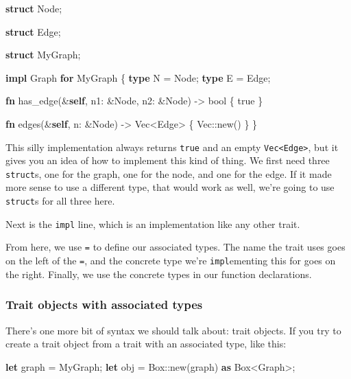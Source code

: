 \documentclass[a4paper,]{book}
\newenvironment{Shaded}{\begin{snugshade}}{\end{snugshade}}
\newcommand{\KeywordTok}[1]{\textcolor[rgb]{0.13,0.29,0.53}{\textbf{{#1}}}}
\newcommand{\DataTypeTok}[1]{\textcolor[rgb]{0.13,0.29,0.53}{{#1}}}
\newcommand{\ConstantTok}[1]{\textcolor[rgb]{0.00,0.00,0.00}{{#1}}}
\newcommand{\NormalTok}[1]{{#1}}
\begin{document}
\begin{Shaded}
\begin{Highlighting}[]
\KeywordTok{struct} \NormalTok{Node;}

\KeywordTok{struct} \NormalTok{Edge;}

\KeywordTok{struct} \NormalTok{MyGraph;}

\KeywordTok{impl} \NormalTok{Graph }\KeywordTok{for} \NormalTok{MyGraph \{}
    \KeywordTok{type} \NormalTok{N = Node;}
    \KeywordTok{type} \NormalTok{E = Edge;}

    \KeywordTok{fn} \NormalTok{has_edge(&}\KeywordTok{self}\NormalTok{, n1: &Node, n2: &Node) -> }\DataTypeTok{bool} \NormalTok{\{}
        \ConstantTok{true}
    \NormalTok{\}}

    \KeywordTok{fn} \NormalTok{edges(&}\KeywordTok{self}\NormalTok{, n: &Node) -> }\DataTypeTok{Vec}\NormalTok{<Edge> \{}
        \DataTypeTok{Vec}\NormalTok{::new()}
    \NormalTok{\}}
\NormalTok{\}}
\end{Highlighting}
\end{Shaded}

This silly implementation always returns \texttt{true} and an empty
\texttt{Vec\textless{}Edge\textgreater{}}, but it gives you an idea of
how to implement this kind of thing. We first need three
\texttt{struct}s, one for the graph, one for the node, and one for the
edge. If it made more sense to use a different type, that would work as
well, we're going to use \texttt{struct}s for all three here.

Next is the \texttt{impl} line, which is an implementation like any
other trait.

From here, we use \texttt{=} to define our associated types. The name
the trait uses goes on the left of the \texttt{=}, and the concrete type
we're \texttt{impl}ementing this for goes on the right. Finally, we use
the concrete types in our function declarations.

\subsubsection{Trait objects with associated
types}\label{trait-objects-with-associated-types}

There's one more bit of syntax we should talk about: trait objects. If
you try to create a trait object from a trait with an associated type,
like this:

\begin{Shaded}
\begin{Highlighting}[]
\KeywordTok{let} \NormalTok{graph = MyGraph;}
\KeywordTok{let} \NormalTok{obj = }\DataTypeTok{Box}\NormalTok{::new(graph) }\KeywordTok{as} \DataTypeTok{Box}\NormalTok{<Graph>;}
\end{Highlighting}
\end{Shaded}
\end{document}
